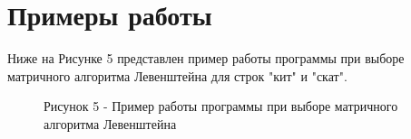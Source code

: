 \documentclass[12pt]{report}
\begin{document}
\section{Примеры работы}
Ниже на Рисунке 5 представлен пример работы программы при выборе матричного алгоритма Левенштейна для строк "кит" и "скат".
\begin{figure}[h!]
	\caption*{Рисунок 5 - Пример работы программы при выборе матричного алгоритма Левенштейна}
\end{figure}
\end{document}
